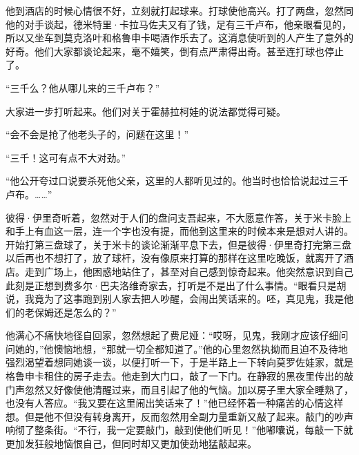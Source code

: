 \par 他到酒店的时候心情很不好，立刻就打起球来。打球使他高兴。打了两盘，忽然同他的对手谈起，德米特里·卡拉马佐夫又有了钱，足有三千卢布，他亲眼看见的，所以又坐车到莫克洛叶和格鲁申卡喝酒作乐去了。这消息使听到的人产生了意外的好奇。他们大家都谈论起来，毫不嬉笑，倒有点严肃得出奇。甚至连打球也停止了。
\par “三千么？他从哪儿来的三千卢布？”
\par 大家进一步打听起来。他们对关于霍赫拉柯娃的说法都觉得可疑。
\par “会不会是抢了他老头子的，问题在这里！”
\par “三千！这可有点不大对劲。”
\par “他公开夸过口说要杀死他父亲，这里的人都听见过的。他当时也恰恰说起过三千卢布。……”
\par 彼得·伊里奇听着，忽然对于人们的盘问支吾起来，不大愿意作答，关于米卡脸上和手上有血这一层，连一个字也没有提，而他到这里来的时候本来是想对人讲的。开始打第三盘球了，关于米卡的谈论渐渐平息下去，但是彼得·伊里奇打完第三盘以后再也不想打了，放了球杆，没有像原来打算的那样在这里吃晚饭，就离开了酒店。走到广场上，他困惑地站住了，甚至对自己感到惊奇起来。他突然意识到自己此刻是正想到费多尔·巴夫洛维奇家去，打听是不是出了什么事情。“眼看只是胡说，我竟为了这事跑到别人家去把人吵醒，会闹出笑话来的。呸，真见鬼，我是他们的老保姆还是怎么的？”
\par 他满心不痛快地径自回家，忽然想起了费尼娅：“哎呀，见鬼，我刚才应该仔细问问她的，”他懊恼地想，“那就一切全都知道了。”他的心里忽然执拗而且迫不及待地强烈渴望着想同她谈一谈，以便打听一下，于是半路上一下转向莫罗佐娃家，就是格鲁申卡租住的房子走去。他走到大门口，敲了一下门。在静寂的黑夜里传出的敲门声忽然又好像使他清醒过来，而且引起了他的气恼。加以房子里大家全睡熟了，也没有人答应。“我又要在这里闹出笑话来了！”他已经怀着一种痛苦的心情这样想。但是他不但没有转身离开，反而忽然用全副力量重新又敲了起来。敲门的吵声响彻了整条街。“不行，我一定要敲门，敲到使他们听见！”他嘟囔说，每敲一下就更加发狂般地恼恨自己，但同时却又更加使劲地猛敲起来。
